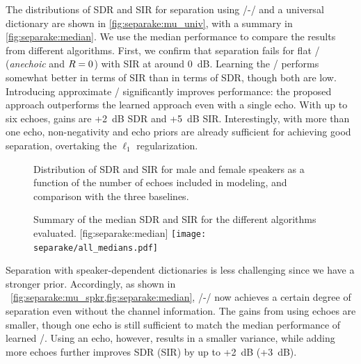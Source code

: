 \mynewline
The distributions of \ac{SDR} and \ac{SIR} for separation using \MU/-\NMF/ and a universal dictionary are shown in \cref{fig:separake:mu_univ}, with a summary in \cref{fig:separake:median}.
We use the median performance to compare the results from different algorithms.
First, we confirm that separation fails for flat \RTFs/ (\textit{anechoic} and $R=0$) with \ac{SIR} at around 0~dB.
Learning the \RTFs/ performs somewhat better in terms of \ac{SIR} than in terms of \ac{SDR}, though both are low.
Introducing approximate \RTFs/ significantly improves performance: the proposed approach outperforms the learned approach even with a single echo.
With up to six echoes, gains are +2~dB \ac{SDR} and +5~dB \ac{SIR}.
Interestingly, with more than one echo, non-negativity and echo priors are already sufficient for achieving good separation, overtaking the $\ell_1$ regularization.


\begin{figure}[t]
    \begin{fullwidth}
    \centering
    \hfill
    \hfill
    \caption{Distribution of \ac{SDR} and \ac{SIR} for male and female speakers as a function of the number of echoes included in modeling, and comparison with the three baselines.}
    \label{fig:separake:results}
    \end{fullwidth}
\end{figure}


\begin{figure}[b]
    \begin{sidecaption}[]{
            Summary of the median \ac{SDR} and \ac{SIR} for the different algorithms evaluated.
        }[fig:separake:median]
        \centering
        \small
        \texttt{[image: separake/all\_medians.pdf]}
    \end{sidecaption}
\end{figure}


\mynewline
Separation with speaker-dependent dictionaries is less challenging since we have a stronger prior.
Accordingly, as shown in ~\cref{fig:separake:mu_spkr,fig:separake:median}, \MU/-\NMF/ now achieves a certain degree of separation even without the channel information.
The gains from using echoes are smaller, though one echo is still sufficient to match the median performance of learned \RTFs/.
Using an echo, however, results in a smaller variance, while adding more echoes further improves \ac{SDR} (\ac{SIR}) by up to +2~dB (+3~dB).

